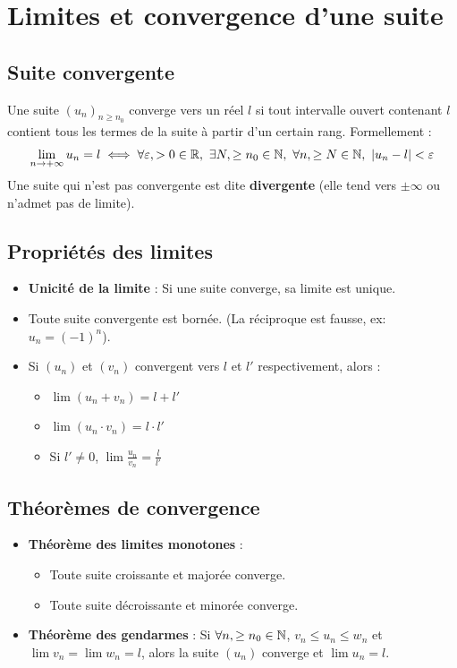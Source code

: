 \documentclass{article}
\begin{document}
	\section{Limites et convergence d'une suite}
	
	\subsection{Suite convergente}
	Une suite $(u_n)_{n \ge n_0}$ converge vers un réel $l$ si tout intervalle ouvert contenant $l$ contient tous les termes de la suite à partir d'un certain rang. Formellement :
	\[ \lim_{n \to +\infty} u_n = l \iff \qcq{\varepsilon}[> 0]{R}, \ \ext{N}[\ge n_0]{N}, \ \qcq{n}[\ge N]{N}, \ |u_n - l| < \varepsilon \]
	Une suite qui n'est pas convergente est dite \textbf{divergente} (elle tend vers $\pm \infty$ ou n'admet pas de limite).
	
	\subsection{Propriétés des limites}
	\begin{itemize}
		\item \textbf{Unicité de la limite} : Si une suite converge, sa limite est unique.
		\item Toute suite convergente est bornée. (La réciproque est fausse, ex: $u_n = (-1)^n$).
		\item Si $(u_n)$ et $(v_n)$ convergent vers $l$ et $l'$ respectivement, alors :
		\begin{itemize}
			\item $\lim (u_n + v_n) = l + l'$
			\item $\lim (u_n \cdot v_n) = l \cdot l'$
			\item Si $l' \ne 0$, $\lim \frac{u_n}{v_n} = \frac{l}{l'}$
		\end{itemize}
	\end{itemize}
	
	\subsection{Théorèmes de convergence}
	\begin{itemize}
		\item \textbf{Théorème des limites monotones} :
		\begin{itemize}
			\item Toute suite croissante et majorée converge.
			\item Toute suite décroissante et minorée converge.
		\end{itemize}
		\item \textbf{Théorème des gendarmes} :
		Si $\qcq{n}[\ge n_0]{N}$, $v_n \le u_n \le w_n$ et $\lim v_n = \lim w_n = l$, alors la suite $(u_n)$ converge et $\lim u_n = l$.
	\end{itemize}
	
\end{document}
